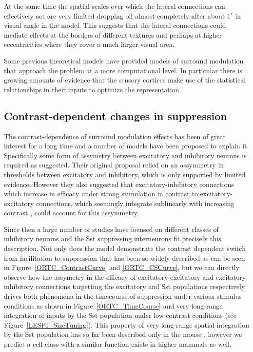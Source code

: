 At the same time the spatial scales over which the lateral connections
can effectively act are very limited dropping off almost completely
after about $1^\circ$ in visual angle in the model. This suggests that
the lateral connections could mediate effects at the borders of
different textures and perhaps at higher eccentricities where they
cover a much larger visual area.

Some previous theoretical models have provided models of surround
modulation that approach the problem at a more computational level. In
particular there is growing amounts of evidence that the sensory
cortices make use of the statistical relationships in their inputs to
optimize the representation

\subsection{Contrast-dependent changes in suppression}

The contrast-dependence of surround modulation effects has been of
great interest for a long time and a number of models have been
proposed to explain it. Specifically some form of assymetry between
excitatory and inhibitory neurons is required as \cite{Somers1998}
suggested. Their original proposal relied on an assymmetry in
thresholds between excitatory and inhibitory, which is only supported
by limited evidence. However they also suggested that
excitatory-inhibitory connections which increase in efficacy under
strong stimulation in contrast to excitatory-excitatory connections,
which seemingly integrate sublinearly with increasing contrast
\citep{Abbott1997, Tsodyks1997}, could account for this assymmetry.

Since then a large number of studies have focused on different classes
of inhibitory neurons and the Sst suppressing interneurons fit
precisely this description. Not only does the model demonstrate the
contrast dependent switch from facilitation to suppression that has
been so widely described \citep{Levitt1997, Polat1998, Dragoi2000,
  Wang2009} as can be seen in Figure~\ref{ORTC_ContrastCurve} and
\ref{ORTC_CSCurve}, but we can directly observe how the assymetry in
the efficacy of excitatory-excitatory and excitatory-inhibitory
connections targetting the excitatory and Sst populations respectively
drives both phenomena in the timecourse of suppression under various
stimulus conditions as shown in Figure~\ref{ORTC_TimeCourse} and very
long-range integration of inputs by the Sst population under low
contrast conditions (see Figure~\ref{LESPI_SizeTuning}). This property
of very long-range spatial integration by the Sst population has so
far been described only in the mouse \citep{Adesnik2012}, however we
predict a cell class with a similar function exists in higher mammals
as well.

